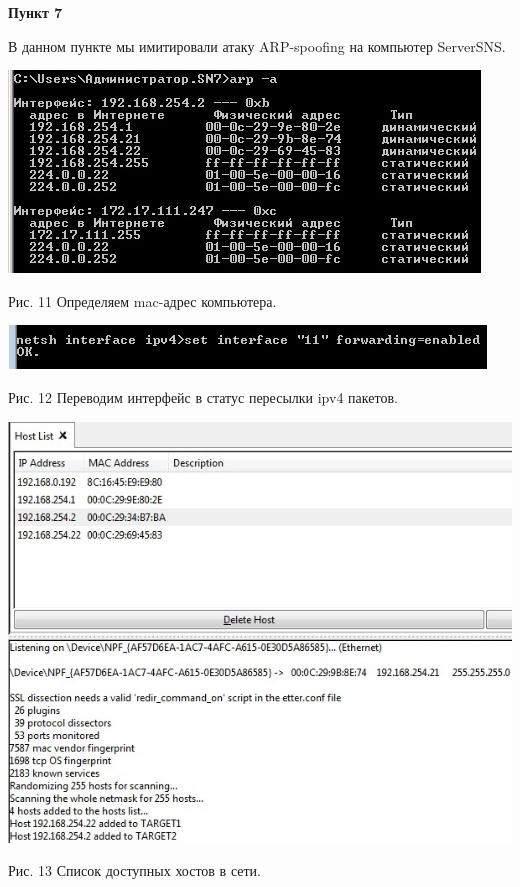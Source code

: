 \documentclass[a4paper,14pt]{extarticle}
\begin{document}
    \textbf{Пункт 7}
    \vspace{-3ex}
    \begin{center}
        \singlespacing
        В данном пункте мы имитировали атаку ARP-spoofing на компьютер ServerSNS.

        \includegraphics[scale=0.8]{pics/7_1.jpg}
        
        Рис. 11 Определяем mac-адрес компьютера.

        \includegraphics[scale=0.8]{pics/7_2.jpg}

        Рис. 12 Переводим интерфейс в статус пересылки ipv4 пакетов.

        \includegraphics[scale=0.64]{pics/7_3.jpg}

        Рис. 13 Список доступных хостов в сети.


\end{center}
\end{document}
